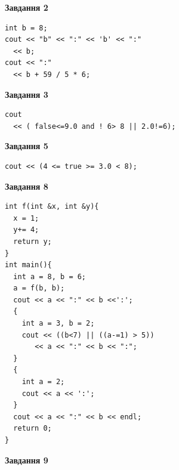 \documentclass[12pt, ukrainian]{article}
\begin{document}
{\begin {large}
\begin{minipage}[t]{7.0cm}
\end{minipage}
\vline \hspace{1mm}
\begin{minipage}[t]{11.0cm}

\begin{center}
\textbf{Завдання 2}
\end{center}
\vspace{-8mm}

\begin{verbatim}
int b = 8;
cout << "b" << ":" << 'b' << ":" 
  << b;
cout << ":" 
  << b + 59 / 5 * 6;
\end{verbatim}



\begin{center}
\textbf{Завдання 3}
\end{center}
\vspace{-8mm}

\begin{verbatim}
cout 
  << ( false<=9.0 and ! 6> 8 || 2.0!=6);
\end{verbatim}



\begin{center}
\textbf{Завдання 5}
\end{center}
\vspace{-8mm}

\begin{verbatim}
cout << (4 <= true >= 3.0 < 8);
\end{verbatim}



\begin{center}
\textbf{Завдання 8}
\end{center}
\vspace{-8mm}

\begin{verbatim}
int f(int &x, int &y){
  x = 1;
  y+= 4;
  return y;
}
int main(){
  int a = 8, b = 6;
  a = f(b, b);
  cout << a << ":" << b <<':';
  {
    int a = 3, b = 2;
    cout << ((b<7) || ((a-=1) > 5))
       << a << ":" << b << ":";
  }
  {
    int a = 2;
    cout << a << ':';
  }
  cout << a << ":" << b << endl;
  return 0;
}
\end{verbatim}

\end{minipage}


\begin{minipage}[t]{7.0cm}

\begin{center}
\textbf{Завдання 9}
\end{center}
\vspace{-8mm}


\end{minipage}
\end{large}}
\end{document}
